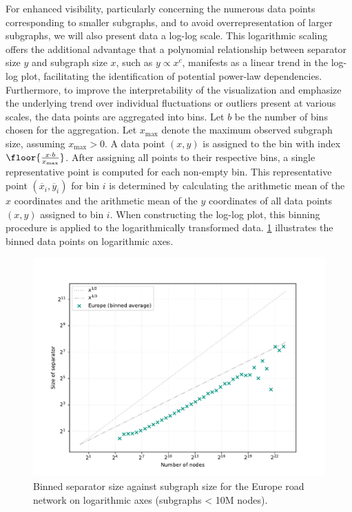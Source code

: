 For enhanced visibility, particularly concerning the numerous data points corresponding to smaller subgraphs, and to avoid overrepresentation of larger subgraphs, we will also present data a log-log scale.
This logarithmic scaling offers the additional advantage that a polynomial relationship between separator size \( y \) and subgraph size \( x \), such as \( y \propto x^c \), manifests as a linear trend in the log-log plot, facilitating the identification of potential power-law dependencies.
Furthermore, to improve the interpretability of the visualization and emphasize the underlying trend over individual fluctuations or outliers present at various scales, the data points are aggregated into bins.
Let \( b \) be the number of bins chosen for the aggregation.
Let \( x_{\max} \) denote the maximum observed subgraph size, assuming \( x_{\max} > 0 \).
A data point \( (x, y) \) is assigned to the bin with index \( \floor{\frac{x \cdot b}{x_{\max}}} \).
After assigning all points to their respective bins, a single representative point is computed for each non-empty bin.
This representative point \( (\overline{x}_i, \overline{y}_i) \) for bin \( i \) is determined by calculating the arithmetic mean of the \( x \) coordinates and the arithmetic mean of the \( y \) coordinates of all data points \( (x, y) \) assigned to bin \( i \).
When constructing the log-log plot, this binning procedure is applied to the logarithmically transformed data.
\cref{fig:separator_size_loglog_binned} illustrates the binned data points on logarithmic axes.

\begin{figure}
	\centering
	\includegraphics[width=0.7\linewidth]{graphics/Europe-binned.pdf}
	\caption{Binned separator size against subgraph size for the Europe road network on logarithmic axes (subgraphs < 10M nodes).}
	\label{fig:separator_size_loglog_binned}
\end{figure}

